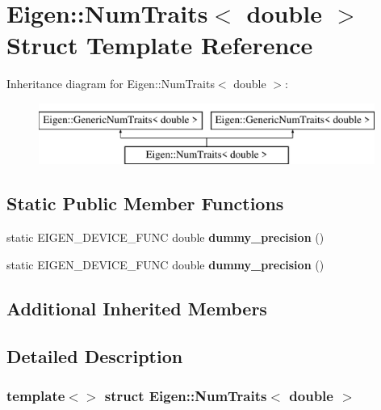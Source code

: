 \hypertarget{struct_eigen_1_1_num_traits_3_01double_01_4}{}\section{Eigen\+:\+:Num\+Traits$<$ double $>$ Struct Template Reference}
\label{struct_eigen_1_1_num_traits_3_01double_01_4}
Inheritance diagram for Eigen\+:\+:Num\+Traits$<$ double $>$\+:\begin{figure}[H]
\begin{center}
\leavevmode
\includegraphics[height=2.000000cm]{struct_eigen_1_1_num_traits_3_01double_01_4}
\end{center}
\end{figure}
\subsection*{Static Public Member Functions}
\begin{DoxyCompactItemize}
\item 
\mbox{\label{struct_eigen_1_1_num_traits_3_01double_01_4_ad123052aa1b3780ae4898fd2aa24c1d7}} 
static E\+I\+G\+E\+N\+\_\+\+D\+E\+V\+I\+C\+E\+\_\+\+F\+U\+NC double {\bfseries dummy\+\_\+precision} ()
\item 
\mbox{\label{struct_eigen_1_1_num_traits_3_01double_01_4_ad123052aa1b3780ae4898fd2aa24c1d7}} 
static E\+I\+G\+E\+N\+\_\+\+D\+E\+V\+I\+C\+E\+\_\+\+F\+U\+NC double {\bfseries dummy\+\_\+precision} ()
\end{DoxyCompactItemize}
\subsection*{Additional Inherited Members}


\subsection{Detailed Description}
\subsubsection*{template$<$$>$\newline
struct Eigen\+::\+Num\+Traits$<$ double $>$}



